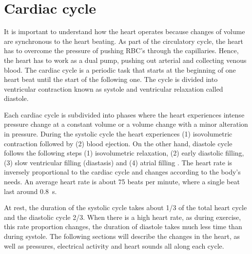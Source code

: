 \section{Cardiac cycle}
\label{background cardiac cycle}
It is important to understand how the heart operates because changes of volume are synchronous to the heart beating. As part of the circulatory cycle, the heart has to overcome the pressure of pushing RBC's through the capillaries. Hence, the heart has to work as a dual pump, pushing out arterial and collecting venous blood. The cardiac cycle is a periodic task that starts at the beginning of one heart beat until the start of the following one. The cycle is divided into ventricular contraction known as systole and ventricular relaxation called diastole. 

Each cardiac cycle is subdivided into phases where the heart experiences intense pressure change at a constant volume or a volume change with a minor alteration in pressure. During the systolic cycle the heart experiences (1) isovolumetric contraction followed by (2) blood ejection. On the other hand, diastole cycle follows the following steps (1) isovolumetric relaxation, (2) early diastolic filling,(3) slow ventricular filling (diastasis) and (4) atrial filling \cite{fukuta2008cardiac}. The heart rate is inversely proportional to the cardiac cycle and changes according to the body's needs. An average heart rate is about 75 beats per minute, where a single beat last around \SI{0.8}{\second}.

At rest, the duration of the systolic cycle takes about 1/3 of the total heart cycle and the diastolic cycle 2/3. When there is a high heart rate, as during exercise, this rate proportion changes, the duration of diastole takes much less time than during systole. The following sections will describe the changes in the heart, as well as pressures, electrical activity and heart sounds all along each cycle.

